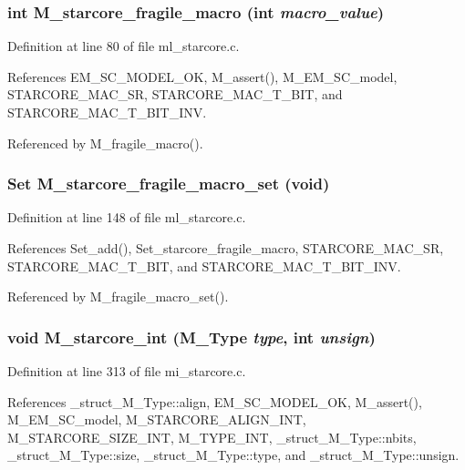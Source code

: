 \subsubsection{\setlength{\rightskip}{0pt plus 5cm}int M\_\-starcore\_\-fragile\_\-macro (int {\em macro\_\-value})}\label{m__starcore_8h_747818cff5bc21edfaf0ced9c55aecd3}




Definition at line 80 of file ml\_\-starcore.c.

References EM\_\-SC\_\-MODEL\_\-OK, M\_\-assert(), M\_\-EM\_\-SC\_\-model, STARCORE\_\-MAC\_\-SR, STARCORE\_\-MAC\_\-T\_\-BIT, and STARCORE\_\-MAC\_\-T\_\-BIT\_\-INV.

Referenced by M\_\-fragile\_\-macro().
\subsubsection{\setlength{\rightskip}{0pt plus 5cm}\bf{Set} M\_\-starcore\_\-fragile\_\-macro\_\-set (void)}\label{m__starcore_8h_57e8ea31a47d0989ad0afac092100a5f}




Definition at line 148 of file ml\_\-starcore.c.

References Set\_\-add(), Set\_\-starcore\_\-fragile\_\-macro, STARCORE\_\-MAC\_\-SR, STARCORE\_\-MAC\_\-T\_\-BIT, and STARCORE\_\-MAC\_\-T\_\-BIT\_\-INV.

Referenced by M\_\-fragile\_\-macro\_\-set().
\subsubsection{\setlength{\rightskip}{0pt plus 5cm}void M\_\-starcore\_\-int (\bf{M\_\-Type} {\em type}, int {\em unsign})}\label{m__starcore_8h_9c6255b28f2525472693f83e6018fe4f}




Definition at line 313 of file mi\_\-starcore.c.

References \_\-struct\_\-M\_\-Type::align, EM\_\-SC\_\-MODEL\_\-OK, M\_\-assert(), M\_\-EM\_\-SC\_\-model, M\_\-STARCORE\_\-ALIGN\_\-INT, M\_\-STARCORE\_\-SIZE\_\-INT, M\_\-TYPE\_\-INT, \_\-struct\_\-M\_\-Type::nbits, \_\-struct\_\-M\_\-Type::size, \_\-struct\_\-M\_\-Type::type, and \_\-struct\_\-M\_\-Type::unsign.


